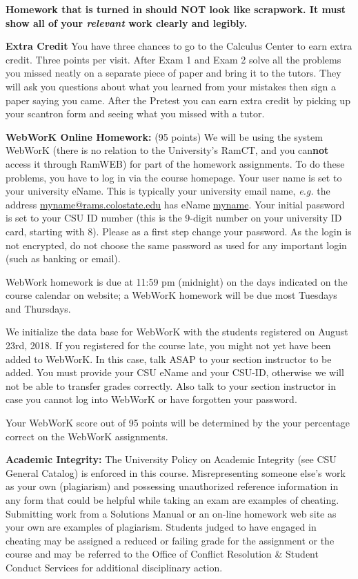 \documentclass[11pt]{article}
\begin{document}
\textbf{Homework that is turned in should NOT look like scrapwork.  It must  show all of your \textit{relevant} work clearly and legibly.}

\textbf{Extra Credit} 
You have three chances to go to the Calculus Center to earn extra credit. Three points per visit.  After Exam 1 and Exam 2 solve all the problems you missed neatly on a separate piece of paper and bring it to the tutors. They will ask  you questions about what you learned from your mistakes then sign a paper saying you came. After the Pretest you can earn extra credit by picking up your scantron form and seeing what you missed with a tutor. 
\vspace{4mm}

\textbf{WebWorK Online Homework:}  (95 points) We will be using the system WebWorK (there is no relation to the University's RamCT, and you can\textbf{not} access it through RamWEB) for part of the homework assignments.  To do these problems, you have to log in via the course homepage.   Your user name is set to your university eName. This is typically your university email name, \textit{e.g.} the address \url{myname@rams.colostate.edu} has eName \url{myname}. Your initial password is set to your  CSU ID number (this is the 9-digit number on your university ID card, starting with 8). Please as a first step change your password. As the login is not encrypted, do not choose the same password as used for any important login (such as banking or email).  

 WebWork homework is due at 11:59 pm (midnight)  on the days indicated on the course calendar on website; a WebWorK homework will be due most Tuesdays and Thursdays.   
 
 We initialize the data base for WebWorK with the students registered on August 23rd, 2018. If you registered for the course late, you might not yet have been added to WebWorK. In this case, talk ASAP to your section instructor to be added. You must provide your CSU eName and your CSU-ID, otherwise we will not be able to transfer grades correctly. Also talk to your section instructor in case you cannot log into WebWorK or have forgotten your password. 

Your WebWorK score out of 95 points will be determined by the your percentage correct on the WebWorK assignments.    


\vspace{8mm}

\noindent \textbf{Academic Integrity:} {\small   The University Policy on Academic Integrity (see CSU General Catalog) is enforced in this course. Misrepresenting someone else's work as your own (plagiarism) and possessing unauthorized
reference information in any form that could be helpful while taking an exam
are examples of cheating.  Submitting work from a Solutions Manual or an
on-line homework web site as your own are examples of plagiarism. Students
judged to have engaged in cheating may be assigned a reduced or failing
grade for the assignment or the course and may be referred to the Office of
Conflict Resolution \& Student Conduct Services for additional disciplinary
action.}
\end{document}
